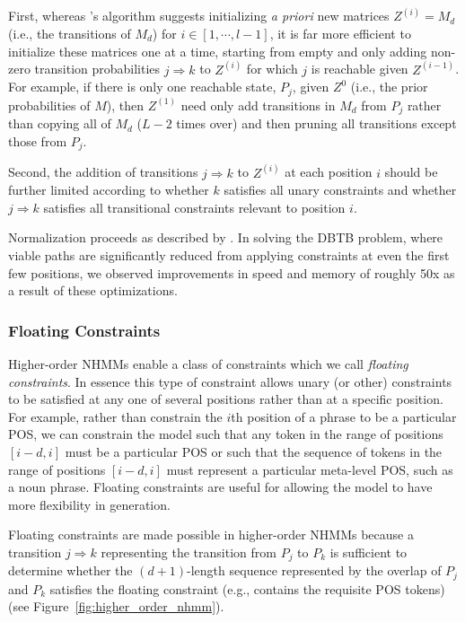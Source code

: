 \documentclass[phd,electronic,oneside,twosidetoc,letterpaper,chaptercenter,parttop,lof,lot]{byumsphd}
\begin{document}
First, whereas \citeauthor{pachet2011finite}'s algorithm suggests initializing \textit{a priori} new matrices $Z^{(i)} = M_d$ (i.e., the transitions of $M_d$) for $i \in [1,\cdots,l-1]$, it is far more efficient to initialize these matrices one at a time, starting from empty and only adding non-zero transition probabilities $j \Rightarrow k$ to $Z^{(i)}$ for which $j$ is reachable given $Z^{(i-1)}$. For example, if there is only one reachable state, $P_j$, given $Z^0$ (i.e., the prior probabilities of $M$), then $Z^{(1)}$ need only add transitions in $M_d$ from $P_j$ rather than copying all of $M_d$ ($L-2$ times over) and then pruning all transitions except those from $P_j$. 

Second, the addition of transitions $j \Rightarrow k$ to $Z^{(i)}$ at each position $i$ should be further limited according to whether $k$ satisfies all unary constraints and whether $j \Rightarrow k$ satisfies all transitional constraints relevant to position $i$. 

Normalization proceeds as described by \citeauthor{pachet2011finite}. In solving the DBTB problem, where viable paths are significantly reduced from applying constraints at even the first few positions, we observed improvements in speed and memory of roughly 50x as a result of these optimizations.

\subsubsection{Floating Constraints}

Higher-order NHMMs enable a class of constraints which we call \textit{floating constraints}. In essence this type of constraint allows unary (or other) constraints to be satisfied at any one of several positions rather than at a specific position. For example, rather than constrain the $i$th position of a phrase to be a particular POS, we can constrain the model such that any token in the range of positions $[i-d,i]$ must be a particular POS or such that the sequence of tokens in the range of positions $[i-d,i]$ must represent a particular meta-level POS, such as a noun phrase. Floating constraints are useful for allowing the model to have more flexibility in generation.

Floating constraints are made possible in higher-order NHMMs because a transition $j \Rightarrow k$ representing the transition from $P_j$ to $P_k$ is sufficient to determine whether the $(d+1)$-length sequence represented by the overlap of $P_j$ and $P_k$ satisfies the floating constraint (e.g., contains the requisite POS tokens)(see Figure~\ref{fig:higher_order_nhmm}).
\end{document}
